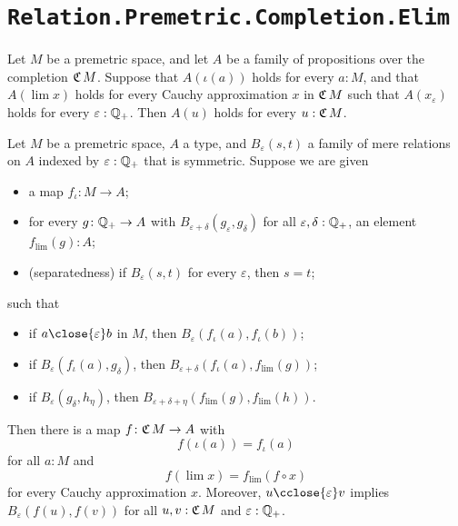 \section{\texttt{Relation.Premetric.Completion.Elim}}

\begin{definition}
  \label{ElimCompletionProp}
  Let $M$ be a premetric space, and let $A$ be a family of propositions over the completion $\mathfrak{C}\,M$. Suppose that $A(\iota(a))$ holds for every $a : M$, and that $A(\lim x)$ holds for every Cauchy approximation $x$ in $\mathfrak{C}\,M$ such that $A(x_\varepsilon)$ holds for every $\varepsilon : \mathbb{Q}_{+}$. Then $A(u)$ holds for every $u : \mathfrak{C}\,M$.
\end{definition}

\begin{definition}
  \label{RecCompletionSym}
  Let $M$ be a premetric space, $A$ a type, and $B_\varepsilon(s, t)$ a family of mere relations on $A$ indexed by $\varepsilon : \mathbb{Q}_{+}$ that is symmetric. Suppose we are given
  \begin{itemize}
  \item a map $f_\iota \colon M \to A$;
  \item for every $g \colon \mathbb{Q}_{+} \to A$ with $B_{\varepsilon + \delta}(g_\varepsilon, g_\delta)$ for all $\varepsilon, \delta : \mathbb{Q}_{+}$, an element $f_{\lim}(g) : A$;
  \item (separatedness) if $B_\varepsilon(s, t)$ for every $\varepsilon$, then $s = t$;
  \end{itemize}
  such that
  \begin{itemize}
  \item if $a \close{\varepsilon} b$ in $M$, then $B_\varepsilon(f_\iota(a), f_\iota(b))$;
  \item if $B_\varepsilon(f_\iota(a), g_\delta)$, then $B_{\varepsilon + \delta}(f_\iota(a), f_{\lim}(g))$;
  \item if $B_\varepsilon(g_\delta, h_\eta)$, then $B_{\varepsilon + \delta + \eta}(f_{\lim}(g), f_{\lim}(h))$.
  \end{itemize}
  Then there is a map $f \colon \mathfrak{C}\,M \to A$ with
  \[
    f(\iota(a)) = f_\iota(a)
  \]
  for all $a : M$ and
  \[
    f(\lim x) = f_{\lim}(f \circ x)
  \]
  for every Cauchy approximation $x$. Moreover, $u \cclose{\varepsilon} v$ implies $B_\varepsilon(f(u), f(v))$ for all $u, v : \mathfrak{C}\,M$ and $\varepsilon : \mathbb{Q}_{+}$.
\end{definition}
